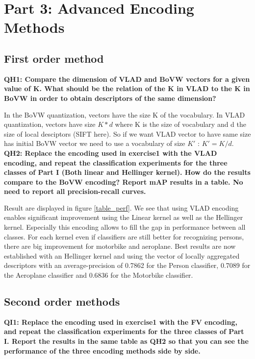 \documentclass[a4paper,11pt]{exam}
\begin{document}
\clearpage

\section{Part 3: Advanced Encoding Methods}

\subsection{First order method}

\textbf{QH1: Compare the dimension of VLAD and BoVW vectors for a given value of K. What should be the relation of the K in VLAD to the K in BoVW in order to obtain descriptors of the same dimension?\\}

In the BoVW quantization, vectors have the size K of the vocabulary. In VLAD quantization, vectors have size $K * d$ where K is the size of vocabulary and d the size of local desciptors (SIFT here). So if we want VLAD vector to have same size has initial BoVW vector we need to use a vocabulary of size $K'$ : $K' = K / d$. \\

\textbf{QH2: Replace the encoding used in exercise1 with the VLAD encoding, and repeat the classification experiments for the three classes of Part I (Both linear and Hellinger kernel). How do the results compare to the BoVW encoding? Report mAP results in a table. No need to report all precision-recall curves.\\}

Result are displayed in figure \ref{table_perf}. We see that using VLAD encoding enables significant improvement using the Linear kernel as well as the Hellinger kernel. Especially this encoding allows to fill the gap in performance between all classes. For each kernel even if classifiers are still better for recognizing persons, there are big improvement for motorbike and aeroplane. Best results are now established with an Hellinger kernel and using the vector of locally aggregated descriptors with an average-precision of 0.7862 for the Person classifier, 0.7089 for the Aeroplane classifier and 0.6836 for the Motorbike classifier.

\subsection{Second order methods}

\textbf{QI1: Replace the encoding used in exercise1 with the FV encoding, and repeat the classification experiments for the three classes of Part I. Report the results in the same table as QH2 so that you can see the performance of the three encoding methods side by side.\\}
\end{document}
